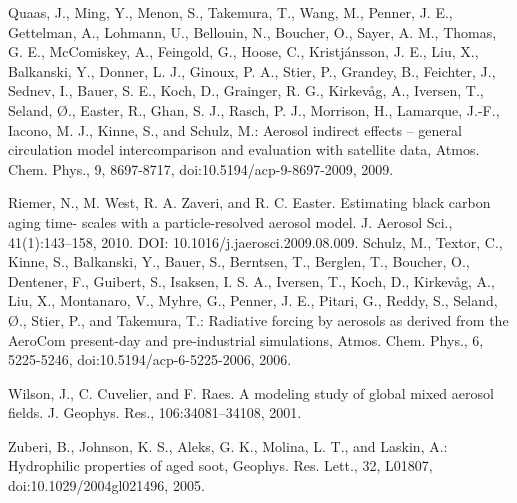 \documentclass[12pt]{article}
\begin{document}
Quaas, J., Ming, Y., Menon, S., Takemura, T., Wang, M., Penner, J. E., Gettelman, A., Lohmann, U., Bellouin, N., Boucher, O., Sayer, A. M., Thomas, G. E., McComiskey, A., Feingold, G., Hoose, C., Kristjánsson, J. E., Liu, X., Balkanski, Y., Donner, L. J., Ginoux, P. A., Stier, P., Grandey, B., Feichter, J., Sednev, I., Bauer, S. E., Koch, D., Grainger, R. G., Kirkevåg, A., Iversen, T., Seland, Ø., Easter, R., Ghan, S. J., Rasch, P. J., Morrison, H., Lamarque, J.-F., Iacono, M. J., Kinne, S., and Schulz, M.: Aerosol indirect effects – general circulation model intercomparison and evaluation with satellite data, Atmos. Chem. Phys., 9, 8697-8717, doi:10.5194/acp-9-8697-2009, 2009.

Riemer, N., M. West, R. A. Zaveri, and R. C. Easter. Estimating black carbon aging time- scales with a particle-resolved aerosol model. J. Aerosol Sci., 41(1):143–158, 2010. DOI: 10.1016/j.jaerosci.2009.08.009.
Schulz, M., Textor, C., Kinne, S., Balkanski, Y., Bauer, S., Berntsen, T., Berglen, T., Boucher, O., Dentener, F., Guibert, S., Isaksen, I. S. A., Iversen, T., Koch, D., Kirkevåg, A., Liu, X., Montanaro, V., Myhre, G., Penner, J. E., Pitari, G., Reddy, S., Seland, Ø., Stier, P., and Takemura, T.: Radiative forcing by aerosols as derived from the AeroCom present-day and pre-industrial simulations, Atmos. Chem. Phys., 6, 5225-5246, doi:10.5194/acp-6-5225-2006, 2006.

Wilson, J., C. Cuvelier, and F. Raes. A modeling study of global mixed aerosol fields. J. Geophys. Res., 106:34081–34108, 2001.

Zuberi, B., Johnson, K. S., Aleks, G. K., Molina, L. T., and Laskin, A.: Hydrophilic properties of aged soot, Geophys. Res. Lett., 32, L01807, doi:10.1029/2004gl021496, 2005.

	
\end{document}
